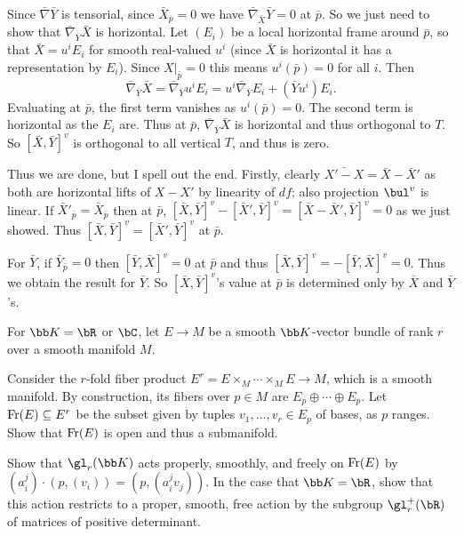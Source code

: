     Since $\bar\nabla\bar Y$ is tensorial, since $\bar X_{\bar p}=0$ we have $\bar\nabla_{\bar X}\bar Y=0$ at $\bar p$.
    So we just need to show that $\bar\nabla_{\bar Y}\bar X$ is horizontal.
    Let $(E_i)$ be a local horizontal frame around $\bar p$, so that $\bar X=u^iE_i$ for smooth real-valued $u^i$ (since $\bar X$ is horizontal it has a representation by $E_i$).
    Since $X|_{\bar p}=0$ this means $u^i(\bar p)=0$ for all $i$.
    Then
    $$ \bar\nabla_{\bar Y}\bar X = \bar\nabla_{\bar Y}u^iE_i = u^i\bar\nabla_{\bar Y}E_i + (\bar Yu^i)E_i . $$
    Evaluating at $\bar p$, the first term vanishes as $u^i(\bar p)=0$.
    The second term is horizontal as the $E_i$ are.
    Thus at $\bar p$, $\bar\nabla_{\bar Y}\bar X$ is horizontal and thus orthogonal to $T$.
    So $[\bar X,\bar Y]^v$ is orthogonal to all vertical $T$, and thus is zero.

    Thus we are done, but I spell out the end.
    Firstly, clearly $\bar{X'-X}=\bar X-\bar X'$ as both are horizontal lifts of $X-X'$ by linearity of $df$; also projection $\bul^v$ is linear.
    If $\bar X'_{\bar p}=\bar X_{\bar p}$ then at $\bar p$, $[\bar X,\bar Y]^v-[\bar X',\bar Y]^v=[\bar X-\bar X',\bar Y]^v=0$ as we just showed.
    Thus $[\bar X,\bar Y]^v=[\bar X',\bar Y]^v$ at $\bar p$.

    For $\bar Y$, if $\bar Y_{\bar p}=0$ then $[\bar Y,\bar X]^v=0$ at $\bar p$ and thus $[\bar X,\bar Y]^v=-[\bar Y,\bar X]^v=0$.
    Thus we obtain the result for $\bar Y$.
    So $[\bar X,\bar Y]^v$'s value at $\bar p$ is determined only by $\bar X$ and $\bar Y$'s.
\eenum

\def\bK{{\bb K}}
\def\Fr{{\rm Fr}}
\def\Or{{\rm Or}}
\bprob

    For $\bK=\bR$ or $\bC$, let $E\to M$ be a smooth $\bK$-vector bundle of rank $r$ over a smooth manifold $M$.
    \benum
        \item Consider the $r$-fold fiber product $E^r=E\times_M\cdots\times_ME\to M$, which is a smooth manifold.
        By construction, its fibers over $p\in M$ are $E_p\oplus\cdots\oplus E_p$.
        Let $\Fr(E)\subseteq E^r$ be the subset given by tuples $v_1,\dots,v_r\in E_p$ of bases, as $p$ ranges.
        Show that $\Fr(E)$ is open and thus a submanifold.

        \item Show that $\gl_r(\bK)$ acts properly, smoothly, and freely on $\Fr(E)$ by $(a^j_i)\cdot(p,(v_i))=(p,(a^j_iv_j))$.
        In the case that $\bK=\bR$, show that this action restricts to a proper, smooth, free action by the subgroup $\gl_r^+(\bR)$ of matrices of positive
        determinant.

